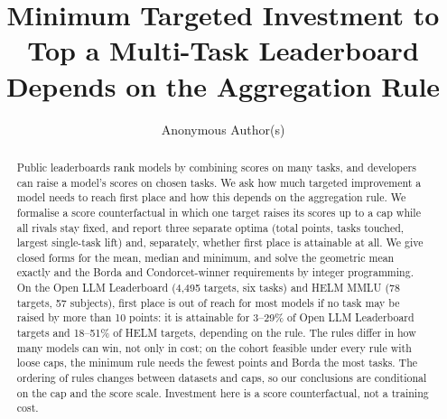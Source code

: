 \documentclass{article}
\title{Minimum Targeted Investment to Top a Multi-Task Leaderboard Depends on the Aggregation Rule}
\author{Anonymous Author(s)}
\begin{document}
\maketitle

\begin{abstract}
Public leaderboards rank models by combining scores on many tasks, and developers can raise a model's scores on chosen tasks.
We ask how much targeted improvement a model needs to reach first place and how this depends on the aggregation rule.
We formalise a score counterfactual in which one target raises its scores up to a cap while all rivals stay fixed, and report three separate optima (total points, tasks touched, largest single-task lift) and, separately, whether first place is attainable at all.
We give closed forms for the mean, median and minimum, and solve the geometric mean exactly and the Borda and Condorcet-winner requirements by integer programming.
On the Open LLM Leaderboard (4,495 targets, six tasks) and HELM MMLU (78 targets, 57 subjects), first place is out of reach for most models if no task may be raised by more than 10 points: it is attainable for 3--29\% of Open LLM Leaderboard targets and 18--51\% of HELM targets, depending on the rule.
The rules differ in how many models can win, not only in cost; on the cohort feasible under every rule with loose caps, the minimum rule needs the fewest points and Borda the most tasks.
The ordering of rules changes between datasets and caps, so our conclusions are conditional on the cap and the score scale.
Investment here is a score counterfactual, not a training cost.
\end{abstract}










\appendix



\end{document}
